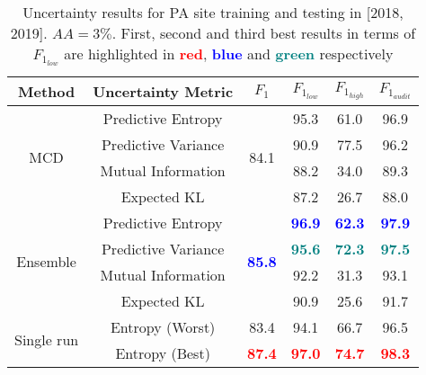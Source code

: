 \begin{table*}[ht!]
\centering
\caption{Uncertainty results for PA site training and testing in [2018, 2019]. $AA=3\%$. First, second and third best results in terms of $F_{1_{low}}$ are highlighted in \textcolor{red}{\textbf{red}}, \textcolor{blue}{\textbf{blue}} and \textcolor{teal}{\textbf{green}} respectively}  %
\begin{tabular}{c|c|c|ccc}
\hline
\textbf{Method}             & \textbf{Uncertainty Metric} & \textbf{$F_1$}                    & \textbf{$F_{1_{low}}$} & \textbf{$F_{1_{high}}$} & \textbf{$F_{1_{audit}}$} \\ \hline
\multirow{4}{*}{MCD} & Predictive Entropy          & \multirow{4}{*}{84.1}          & 95.3            & 61.0             & 96.9              \\
                            & Predictive Variance         &                                & 90.9            & 77.5             & 96.2              \\
                            & Mutual Information          &                                & 88.2            & 34.0             & 89.3              \\
                            & Expected KL                 &                                & 87.2            & 26.7             & 88.0              \\ \hline
\multirow{4}{*}{Ensemble}   & Predictive Entropy          & \multirow{4}{*}{\textcolor{blue}{\textbf{85.8}}} & \textcolor{blue}{\textbf{96.9}}   & \textcolor{blue}{\textbf{62.3}}    & \textcolor{blue}{\textbf{97.9}}     \\
                            & Predictive Variance         &                                & \textcolor{teal}{\textbf{95.6}}            & \textcolor{teal}{\textbf{72.3}}             & \textcolor{teal}{\textbf{97.5}}              \\
                            & Mutual Information          &                                & 92.2            & 31.3             & 93.1              \\
                            & Expected KL                 &                                & 90.9            & 25.6             & 91.7              \\ \hline
\multirow{2}{*}{Single run} & Entropy (Worst)             & 83.4                           & 94.1            & 66.7             & 96.5              \\  
                            & Entropy (Best)              & \textcolor{red}{\textbf{87.4}}                           & \textcolor{red}{\textbf{97.0}}            & \textcolor{red}{\textbf{74.7}}             & \textcolor{red}{\textbf{98.3}}              \\ \hline

\end{tabular}
\label{tab:PA_results_t1}
\end{table*}



